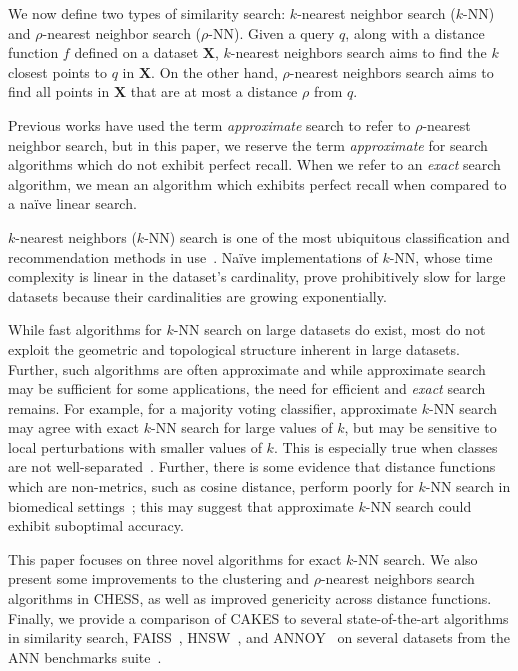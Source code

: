 We now define two types of similarity search: $k$-nearest neighbor search ($k$-NN) and $\rho$-nearest neighbor search ($\rho$-NN). 
Given a query $q$, along with a distance function $f$ defined on a dataset $\textbf{X}$, $k$-nearest neighbors search 
aims to find the $k$ closest points to $q$ in $ \textbf{X}$.
On the other hand, $\rho$-nearest neighbors search aims to find all points in $\textbf{X}$ that are at most a distance $\rho$ from $q$.

Previous works have used the term \emph{approximate} search to refer to $\rho$-nearest neighbor search, but in this paper, 
we reserve the term \emph{approximate} for search algorithms which do not exhibit perfect recall.
When we refer to an \emph{exact} search algorithm, we mean an algorithm which exhibits perfect recall when compared to a na\"{i}ve linear search.

$k$-nearest neighbors ($k$-NN) search is one of the most ubiquitous classification and recommendation methods in use~\cite{fix1952discriminatory, cover1967nearest}. 
Na\"{i}ve implementations of $k$-NN, whose time complexity is linear in the dataset's cardinality, prove prohibitively slow for large datasets because their cardinalities are growing exponentially.

While fast algorithms for $k$-NN search on large datasets do exist, most do not exploit the geometric and topological structure inherent in large datasets.
Further, such algorithms are often approximate and while approximate search may be sufficient for some applications, the need for efficient and \emph{exact} search remains.
For example, for a majority voting classifier, approximate $k$-NN search may agree with exact $k$-NN search for large values of $k$, but may be sensitive to local perturbations with smaller values of $k$.
This is especially true when classes are not well-separated~\cite{zhang2022imbalanced}.
Further, there is some evidence that distance functions which are non-metrics, such as cosine distance, perform poorly for $k$-NN search in biomedical settings~\cite{hu2016distance};
this may suggest that approximate $k$-NN search could exhibit suboptimal accuracy.

This paper focuses on three novel algorithms for exact $k$-NN search.
We also present some improvements to the clustering and $\rho$-nearest neighbors search algorithms in CHESS, as well as improved genericity across distance functions.
Finally, we provide a comparison of CAKES to several state-of-the-art algorithms in similarity search, FAISS~\cite{johnson2019billion}, HNSW~\cite{malkov2016hnsw}, and ANNOY~\cite{annoy} on several datasets from the ANN benchmarks suite~\cite{aumuller2020ann}.

